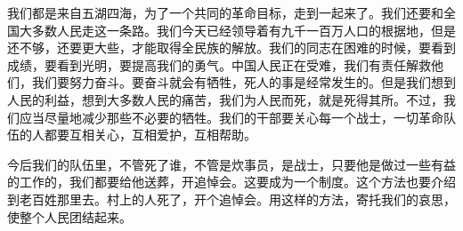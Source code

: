 我们都是来自五湖四海，为了一个共同的革命目标，走到一起来了。我们还要和全国大多数人民走这一条路。我们今天已经领导着有九千一百万人口的根据地，但是还不够，还要更大些，才能取得全民族的解放。我们的同志在困难的时候，要看到成绩，要看到光明，要提高我们的勇气。中国人民正在受难，我们有责任解救他们，我们要努力奋斗。要奋斗就会有牺牲，死人的事是经常发生的。但是我们想到人民的利益，想到大多数人民的痛苦，我们为人民而死，就是死得其所。不过，我们应当尽量地减少那些不必要的牺牲。我们的干部要关心每一个战士，一切革命队伍的人都要互相关心，互相爱护，互相帮助。

今后我们的队伍里，不管死了谁，不管是炊事员，是战士，只要他是做过一些有益的工作的，我们都要给他送葬，开追悼会。这要成为一个制度。这个方法也要介绍到老百姓那里去。村上的人死了，开个追悼会。用这样的方法，寄托我们的哀思，使整个人民团结起来。